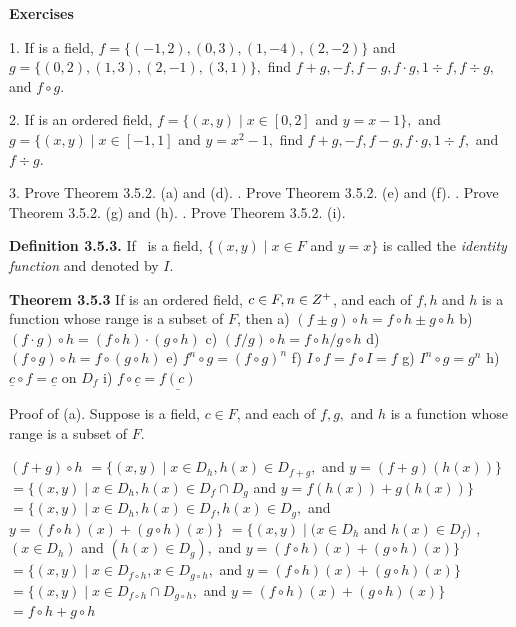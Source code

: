 \begin{large}
\textbf{Exercises}\nl

1. 	If \fld is a field, $f =\{(-1,2), (0,3), (1,-4), (2,-2)\}$ and $g = \{ (0,2), (1,3), (2,-1), (3,1)\},$ find $f+g, -f, f-g, f\cdot g, 1\div f, f\div g,$ and $f\circ g.$\nl

2. 	If \of is an ordered field, $f = \{(x,y) \mid x\in  [0,2]$ and $y = x - 1\},$ and $g= \{(x,y) \mid  x\in  [-1,1]$ and $y = x^{2} - 1,$ find $f+g, -f, f-g, f\cdot g, 1\div f,$ and $f\div g.$ \nl

3. 	Prove Theorem 3.5.2. (a) and (d). . 	Prove Theorem 3.5.2. (e) and (f). . 	Prove Theorem 3.5.2. (g) and (h). . 	Prove Theorem 3.5.2. (i). \nl


\textbf{Definition 3.5.3.} If \fld~is a field, $\{(x,y) \mid x\in F$ and $y = x\}$ is called the \textit{identity function} and denoted by $I.$\nl

\newpage

\textbf{Theorem 3.5.3}  If \of is an ordered field, $c \in F, n \in Z^{+}$,  and each of $f, h $ and $h$ is a function whose range is a subset of $F$, then\nl
a) $( f \pm g) \circ h = f\circ h \pm g\circ h$\nl
b) $(f\cdot g)\circ h = (f\circ h)\cdot (g\circ h)$\nl
c) $(f/g)\circ h = f\circ h/g\circ h$\nl
d) $(f\circ g)\circ h = f\circ (g \circ h)$\nl
e) $f^{n}\circ g = (f\circ g)^{n}$\nl
f) $I\circ f = f\circ I = f$\nl
g) $I^{n}\circ g = g^{n}$\nl
h) $\underline{c}\circ f = \underline{c}$ on $D_{f}$\nl
i) $f\circ \underline{c} = \underline{f(c)}$\nl

Proof of (a).   Suppose \fld is a field, $c \in F$, and each of $f, g,$ and $h$ is a function whose range is a subset of $F$.\nl

$(f + g)\circ h$\nl
$= \{ (x,y) \mid x \in D_{h}, h(x) \in D_{f+g},$ and $y = (f+g)(h(x))\}$\nl
$= \{ (x,y) \mid x \in D_{h},h(x)\in D_{f}\cap D_{g}$ and $y = f(h(x)) + g(h(x))  \}$\nl
$= \{ (x,y) \mid x\in D_{h}, h(x) \in D_{f}, h(x)\in D_{g},$ and $ y=(f\circ h)(x) + (g\circ h)(x)\}$\nl
$= \{ (x,y) \mid (x\in D_{h}$ and  $h(x) \in D_{f})$ , $(x \in D_{h})$ and $(h(x) \in D_{g}),$ 
 and $y = (f\circ h)(x) + (g\circ h)(x) \}$\nl
$= \{ (x,y) \mid x\in D_{f\circ h}, x\in D_{g\circ h},$ and $y = (f\circ h)(x) + (g\circ h)(x) \}$\nl
$= \{ (x,y) \mid x\in D_{f\circ h} \cap D_{g\circ h},$ and  $y = (f\circ h)(x) + (g\circ h)(x) \}$\nl
$= f\circ h + g\circ h$\nl


\end{large}
